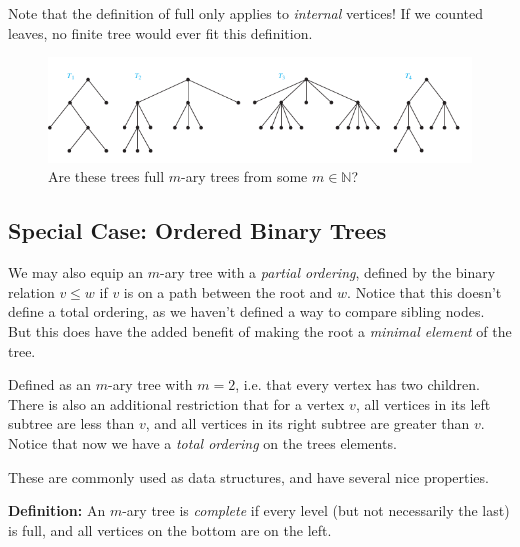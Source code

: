 \documentclass[a4paper,10pt]{report}
\begin{document}
Note that the definition of full only applies to \textit{internal} vertices! If we counted leaves, no finite tree would ever fit this definition.

\begin{figure}[h!]
	\begin{centering}
	\begin{center}
	\includegraphics[width=\linewidth]{./Pictures/m_ary_exercise.png}
	\caption{Are these trees full $m$-ary trees from some $m\in\mathbb{N}$?}
	\label{fig:??????}
	\end{center}
	\par\end{centering}
\end{figure}

\subsection{Special Case: Ordered Binary Trees}

We may also equip an $m$-ary tree with a \textit{partial ordering}, defined by the binary relation $v\leq w$ if $v$ is on a path between the root and $w$. Notice that this doesn't define a total ordering, as we haven't defined a way to compare sibling nodes. But this does have the added benefit of making the root a \textit{minimal element} of the tree.

Defined as an $m$-ary tree with $m=2$, i.e. that every vertex has two children. There is also an additional restriction that for a vertex $v$, all vertices in its left subtree are less than $v$, and all vertices in its right subtree are greater than $v$. Notice that now we have a \textit{total ordering} on the trees elements.

These are commonly used as data structures, and have several nice properties.

\textbf{Definition: }An $m$-ary tree  is \textit{complete} if every level (but not necessarily the last) is full, and all vertices on the bottom are on the left.
\end{document}

